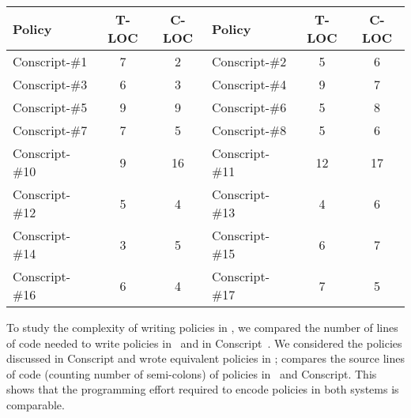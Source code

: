 \begin{figure*}[t!]
\setlength{\tabcolsep}{2pt}
\centering
\scriptsize %
\begin{tabular}{|l|c|c||l|c|c|}
\hline 
\textbf{Policy}  & \textbf{T-LOC} & \textbf{C-LOC} &
  \textbf{Policy}  & \textbf{T-LOC} & \textbf{C-LOC}\\
\hline
  Conscript-\#1     & 7   & 2 
& Conscript-\#2     & 5   & 6\\
  Conscript-\#3     & 6   & 3 
& Conscript-\#4     & 9   & 7\\
  Conscript-\#5     & 9   & 9 
& Conscript-\#6     & 5   & 8\\
  Conscript-\#7     & 7   & 5 
& Conscript-\#8     & 5   & 6\\
  Conscript-\#10    & 9   & 16 
& Conscript-\#11    & 12  & 17\\
  Conscript-\#12    & 5   & 4 
& Conscript-\#13    & 4   & 6\\ 
  Conscript-\#14    & 3   & 5 
& Conscript-\#15    & 6   & 7\\
  Conscript-\#16    & 6   & 4 
& Conscript-\#17    & 7   & 5\\
\hline
\end{tabular}
{\label{figure:policies-LOC}}
\end{figure*}

To study the complexity of writing policies in \txjs, we compared the number of
lines of code needed to write policies in \txjs\ and in
Conscript~\cite{conscript:oak10}.  We considered the policies discussed in 
Conscript and wrote equivalent policies in \txjs;
 compares the source lines of code (counting number
of semi-colons) of policies in \txjs\ and Conscript. This shows that the
programming effort required to encode policies in both systems is comparable.


